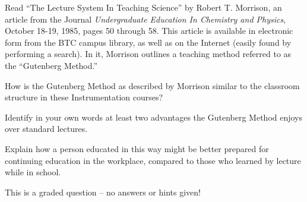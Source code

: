 

Read ``The Lecture System In Teaching Science'' by Robert T. Morrison, an article from the Journal {\it Undergraduate Education In Chemistry and Physics}, October 18-19, 1985, pages 50 through 58.  This article is available in electronic form from the BTC campus library, as well as on the Internet (easily found by performing a search).  In it, Morrison outlines a teaching method referred to as the ``Gutenberg Method.''

\vskip 20pt

How is the Gutenberg Method as described by Morrison similar to the classroom structure in these Instrumentation courses?

\vskip 100pt

Identify in your own words at least two advantages the Gutenberg Method enjoys over standard lectures.

\vskip 100pt

Explain how a person educated in this way might be better prepared for continuing education in the workplace, compared to those who learned by lecture while in school.

\vfil

\eject






This is a graded question -- no answers or hints given!











